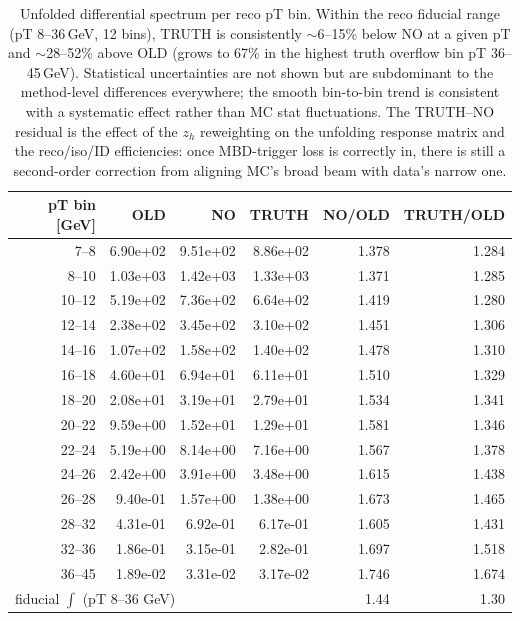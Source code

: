 \documentclass[11pt,a4paper]{article}
\begin{document}
\begin{table}[H]
\centering\small
\begin{tabular}{rrrrrr}
\toprule
pT bin [GeV] & OLD & NO & TRUTH & NO/OLD & TRUTH/OLD\\
\midrule
  7--8    & 6.90e+02 & 9.51e+02 & 8.86e+02 & 1.378 & 1.284\\
  8--10   & 1.03e+03 & 1.42e+03 & 1.33e+03 & 1.371 & 1.285\\
 10--12   & 5.19e+02 & 7.36e+02 & 6.64e+02 & 1.419 & 1.280\\
 12--14   & 2.38e+02 & 3.45e+02 & 3.10e+02 & 1.451 & 1.306\\
 14--16   & 1.07e+02 & 1.58e+02 & 1.40e+02 & 1.478 & 1.310\\
 16--18   & 4.60e+01 & 6.94e+01 & 6.11e+01 & 1.510 & 1.329\\
 18--20   & 2.08e+01 & 3.19e+01 & 2.79e+01 & 1.534 & 1.341\\
 20--22   & 9.59e+00 & 1.52e+01 & 1.29e+01 & 1.581 & 1.346\\
 22--24   & 5.19e+00 & 8.14e+00 & 7.16e+00 & 1.567 & 1.378\\
 24--26   & 2.42e+00 & 3.91e+00 & 3.48e+00 & 1.615 & 1.438\\
 26--28   & 9.40e-01 & 1.57e+00 & 1.38e+00 & 1.673 & 1.465\\
 28--32   & 4.31e-01 & 6.92e-01 & 6.17e-01 & 1.605 & 1.431\\
 32--36   & 1.86e-01 & 3.15e-01 & 2.82e-01 & 1.697 & 1.518\\
 36--45   & 1.89e-02 & 3.31e-02 & 3.17e-02 & 1.746 & 1.674\\
\midrule
\multicolumn{3}{l}{fiducial $\int$ (pT 8--36 GeV)} & & 1.44 & 1.30\\
\bottomrule
\end{tabular}
\caption{Unfolded differential spectrum per reco pT bin. Within the reco fiducial range (pT $8$--$36$\,GeV, 12 bins), TRUTH is consistently $\sim$6--15\% below NO at a given pT and $\sim$28--52\% above OLD (grows to 67\% in the highest truth overflow bin pT 36--45\,GeV). Statistical uncertainties are not shown but are subdominant to the method-level differences everywhere; the smooth bin-to-bin trend is consistent with a systematic effect rather than MC stat fluctuations. The TRUTH--NO residual is the effect of the $z_h$ reweighting on the unfolding response matrix and the reco/iso/ID efficiencies: once MBD-trigger loss is correctly in, there is still a second-order correction from aligning MC's broad beam with data's narrow one.}
\label{tab:xs}
\end{table}
\end{document}
